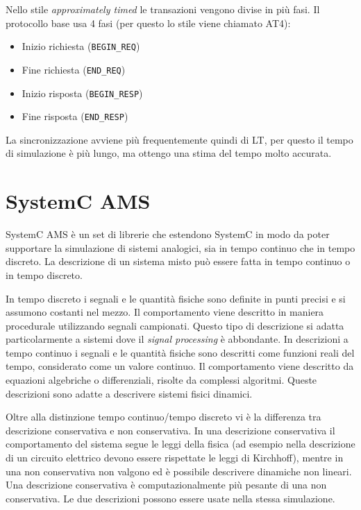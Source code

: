 \documentclass[10pt,a4paper,oneside]{scrbook}
\begin{document}
Nello stile \textit{approximately timed} le transazioni vengono divise in più fasi. Il protocollo base usa 4 fasi (per questo lo stile viene chiamato AT4):
\begin{itemize}
    \item Inizio richiesta (\texttt{BEGIN\_REQ})
    \item Fine richiesta (\texttt{END\_REQ})
    \item Inizio risposta (\texttt{BEGIN\_RESP})
    \item Fine risposta (\texttt{END\_RESP})
\end{itemize}
La sincronizzazione avviene più frequentemente quindi di LT, per questo il tempo di simulazione è più lungo, ma ottengo una stima del tempo molto accurata.


\section{SystemC AMS}
SystemC AMS è un set di librerie che estendono SystemC in modo da poter supportare la simulazione di sistemi analogici, sia in tempo continuo che in tempo discreto.
La descrizione di un sistema misto può essere fatta in tempo continuo o in tempo discreto.

In tempo discreto i segnali e le quantità fisiche sono definite in punti precisi e si assumono costanti nel mezzo.
Il comportamento viene descritto in maniera procedurale utilizzando segnali campionati.
Questo tipo di descrizione si adatta particolarmente a sistemi dove il \textit{signal processing} è abbondante.
In descrizioni a tempo continuo i segnali e le quantità fisiche sono descritti come funzioni reali del tempo,
considerato come un valore continuo.
Il comportamento viene descritto da equazioni algebriche o differenziali, risolte da complessi algoritmi.
Queste descrizioni sono adatte a descrivere sistemi fisici dinamici.

Oltre alla distinzione tempo continuo/tempo discreto vi è la differenza tra descrizione conservativa e non conservativa.
In una descrizione conservativa il comportamento del sistema segue le leggi della fisica (ad esempio nella descrizione
di un circuito elettrico devono essere rispettate le leggi di Kirchhoff), mentre in una non conservativa
non valgono ed è possibile descrivere dinamiche non lineari.
Una descrizione conservativa è computazionalmente più pesante di una non conservativa.
Le due descrizioni possono essere usate nella stessa simulazione.
\end{document}
